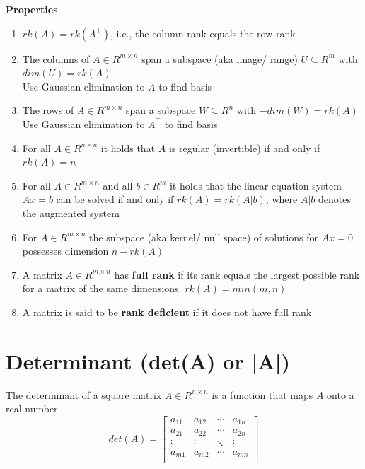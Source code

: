\vspace{0.2cm}
\noindent\textbf{Properties}
\begin{enumerate}
    \item $rk(A) = rk(A^\top )$, i.e., the column rank equals the row rank

    \item The columns of $A \in  R^{m\times n}$ span a subspace (aka image/ range) $U \subseteq R^m$ with $dim(U) = rk(A)$\\
    Use Gaussian elimination to $A$ to find basis
    
    \item The rows of $A \in  R^{m\times n}$ span a subspace $W \subseteq R^n$ with $-dim(W) = rk(A)$\\
    Use Gaussian elimination to $A^\top$ to find basis
    
    \item For all $A \in  R^{n\times n}$ it holds that $A$ is regular (invertible) if and only if $rk(A) = n$
    
    \item For all $A \in  R^{m\times n}$ and all $b \in  R^m$ it holds that the linear equation system $Ax = b$ can be solved if and only if $rk(A) = rk(A|b)$, where $A|b$ denotes the augmented system
    
    \item For $A \in  R^{m\times n}$ the subspace (aka kernel/ null space) of solutions for $Ax = 0$ possesses dimension $n - rk(A)$
    
    \item A matrix $A \in  R^{m\times n}$ has \textbf{full rank} if its rank equals the largest possible rank for a matrix of the same dimensions. $rk(A) = min(m, n)$
    
    \item A matrix is said to be \textbf{rank deficient} if it does not have full rank
\end{enumerate}

\section{Determinant (det(A) or |A|)}\label{matrix: Determinant}
The determinant of a square matrix $A \in R^{n\times n}$ is a function that maps $A$ onto a real number.
\[
    det(A) = \begin{bmatrix}
        a_{11} & a_{12} & \cdots & a_{1n} \\
        a_{21} & a_{22} & \cdots & a_{2n} \\
        \vdots & \vdots & \ddots & \vdots \\
        a_{m1} & a_{m2} & \cdots & a_{mn} \\
    \end{bmatrix}
\]

